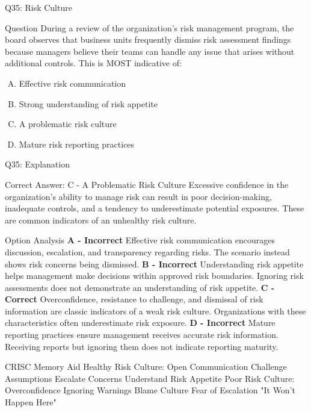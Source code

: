 \documentclass{beamer}
\begin{document}
	
	\begin{frame}{Q35: Risk Culture} \begin{block}{Question} During a review of the organization's risk management program, the board observes that business units frequently dismiss risk assessment findings because managers believe their teams can handle any issue that arises without additional controls. This is MOST indicative of: \end{block} \begin{enumerate}[(A)] \item Effective risk communication \item Strong understanding of risk appetite \item A problematic risk culture \item Mature risk reporting practices \end{enumerate} \end{frame} \begin{frame}[shrink=10]{Q35: Explanation} \footnotesize \begin{block}{Correct Answer: C - A Problematic Risk Culture} Excessive confidence in the organization's ability to manage risk can result in poor decision-making, inadequate controls, and a tendency to underestimate potential exposures. These are common indicators of an unhealthy risk culture. \end{block} \begin{block}{Option Analysis} \textbf{A - Incorrect} Effective risk communication encourages discussion, escalation, and transparency regarding risks. The scenario instead shows risk concerns being dismissed. \vspace{0.15cm} \textbf{B - Incorrect} Understanding risk appetite helps management make decisions within approved risk boundaries. Ignoring risk assessments does not demonstrate an understanding of risk appetite. \vspace{0.15cm} \textbf{C - Correct} Overconfidence, resistance to challenge, and dismissal of risk information are classic indicators of a weak risk culture. Organizations with these characteristics often underestimate risk exposure. \vspace{0.15cm} \textbf{D - Incorrect} Mature reporting practices ensure management receives accurate risk information. Receiving reports but ignoring them does not indicate reporting maturity. \end{block} \begin{block}{CRISC Memory Aid} Healthy Risk Culture: Open Communication Challenge Assumptions Escalate Concerns Understand Risk Appetite \vspace{0.15cm} Poor Risk Culture: Overconfidence Ignoring Warnings Blame Culture Fear of Escalation "It Won't Happen Here" \end{block} \end{frame}
	
\end{document}
